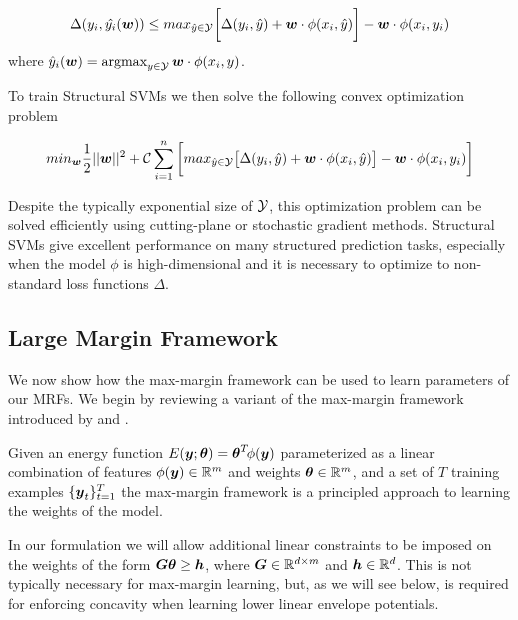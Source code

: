 \documentclass[twoside,doublespace,onecolumn,11pt,a4paper]{book}
\renewcommand{\citename}{\citet}
\begin{document}
\begin{align}
  \label{eq:ssvm_bound}
  \Delta(y_i,\hat{ y_i }({\boldsymbol{w}}))\leq max_{\hat{y}\in{\cal Y}}\bigg[\Delta(y_i,\hat{ y })+{\boldsymbol{w}}\cdot\phi(x_i,\hat{y})\bigg]-{\boldsymbol{w}}\cdot\phi(x_i,y_i)
\end{align}
\noindent where $\hat{y}_i({\boldsymbol{w}})=\mathop{\textrm{argmax}}_{y\in{\cal Y}}{\boldsymbol{w}}\cdot\phi(x_i,y)$.

To train Structural SVMs we then solve the following convex
optimization problem

\begin{align}
  \label{eq:ssvm_objective}
  min_{{\boldsymbol{w}}}\frac{1}{2}||{\boldsymbol{w}}||^2+{\cal C}\sum_{i=1}^{n}\bigg[max_{\hat{y}\in{\cal Y}}\big[\Delta(y_i,\hat{ y })+{\boldsymbol{w}}\cdot\phi(x_i,\hat{y})\big]-{\boldsymbol{w}}\cdot\phi(x_i,y_i)\bigg]
\end{align}

Despite the typically exponential size of ${\cal Y}$, this optimization
problem can be solved efficiently using cutting-plane or
stochastic gradient methods. Structural SVMs give excellent
performance on many structured prediction tasks, especially when
the model $\phi$ is high-dimensional and it is necessary to
optimize to non-standard loss functions $\Delta$.

\subsection{Large Margin Framework}
\label{sec:large_margin}

We now show how the max-margin framework can be used to learn
parameters of our MRFs. We begin by reviewing a variant of the
max-margin framework introduced by
\citename{Tsochantaridis:ICML04} and \citename{Taskar:ICML05}.

Given an energy function $E\!\left({\boldsymbol{y}}; \boldsymbol{\theta}\right) = \boldsymbol{\theta}^T \!
\phi({\boldsymbol{y}})$ parameterized as a linear combination of features
$\phi({\boldsymbol{y}}) \in \mathbb{R}^m$ and weights $\boldsymbol{\theta} \in \mathbb{R}^m$, and a set
of $T$ training examples $\{{\boldsymbol{y}}_t\}_{t=1}^T$ the max-margin framework
is a principled approach to learning the weights of the model.

In our formulation we will allow additional linear constraints to be
imposed on the weights of the form ${\boldsymbol{G}} \boldsymbol{\theta} \geq {\boldsymbol{h}}$, where ${\boldsymbol{G}}
\in \mathbb{R}^{d \times m}$ and ${\boldsymbol{h}} \in \mathbb{R}^d$. This is not typically
necessary for max-margin learning, but, as we will see below, is
required for enforcing concavity when learning lower linear envelope
potentials.
\end{document}

